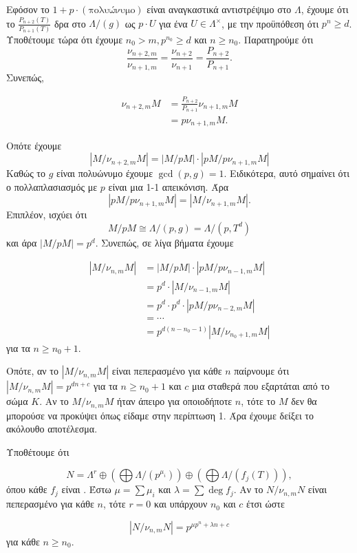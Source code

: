 \noindent Εφόσον το $1+p\cdot (\text{πολυώνυμο})$ είναι αναγκαστικά αντιστρέψιμο στο $\Lambda$, έχουμε ότι το $\frac{P_{n+2}(T)}{P_{n+1}(T)}$ δρα στο $\Lambda/(g)$ ως $p\cdot U$ για ένα $U \in \Lambda^\times$, με την προϋπόθεση ότι $p^n\geq d$. 
Υποθέτουμε τώρα ότι έχουμε $n_0 > m, p^{n_0} \geq d$ και $n\geq n_0$. Παρατηρούμε ότι
$$\frac{\nu_{n+2,m}}{\nu_{n+1,m}} = \frac{\nu_{n+2}}{\nu_{n+1}} = \frac{P_{n+2}}{P_{n+1}}.$$ Συνεπώς,

\begin{align*}
    \nu_{n+2,m} M &= \frac{P_{n+2}}{P_{n+1}} \nu_{n+1,m} M \\
    &= p \nu_{n+1,m}M .
\end{align*}

\noindent Οπότε έχουμε
$$|M/\nu_{n+2,m}M| = |M/pM| \cdot |pM/p\nu_{n+1,m}M|$$ Καθώς το $g$ είναι  πολυώνυμο έχουμε $\gcd(p,g)=1$. Ειδικότερα, αυτό σημαίνει ότι ο πολλαπλασιασμός με $p$ είναι μια 1-1 απεικόνιση. Άρα
$$|pM/p\nu_{n+1,m}M| = |M/\nu_{n+1,m}M|.$$ Επιπλέον, ισχύει ότι
$$M/pM \cong \Lambda/(p,g) = \Lambda/(p,T^d)$$ και άρα $|M/pM| = p^d$. Συνεπώς, σε λίγα βήματα έχουμε

\begin{align*}
    |M/\nu_{n,m}M| &= |M/pM| \cdot | pM/ p \nu_{n-1,m}M| \\
    &= p^d \cdot |M/\nu_{n-1,m}M| \\
    &= p^d \cdot p^d \cdot |pM/p\nu_{n-2,m}M| \\
    &= \cdots \\
    &= p^{d(n-n_0-1)}|M/\nu_{n_0+1,m}M|
\end{align*} για τα $n\geq n_0+1$.

\noindent Οπότε, αν το $|M/\nu_{n,m}M|$ είναι πεπερασμένο για κάθε $n$ παίρνουμε ότι $|M/\nu_{n,m}M| = p^{dn+c}$ για τα $n\geq n_0 + 1$ και $c$ μια σταθερά που εξαρτάται από το σώμα $K$. Αν το $M/\nu_{n,m}M$ ήταν άπειρο για οποιοδήποτε $n$, τότε το $M$ δεν θα μπορούσε να προκύψει όπως είδαμε στην περίπτωση 1. Άρα έχουμε δείξει το ακόλουθο αποτέλεσμα. 

\begin{prop}
    Υποθέτουμε ότι 

    $$N = \Lambda^r \oplus \left( \bigoplus \Lambda/(p^{\mu_i})\right) \oplus \left(\bigoplus \Lambda/(f_j(T))\right),$$ όπου κάθε $f_j$ είναι . Έστω $\mu = \sum \mu_i$ και $\lambda = \sum \deg f_j$. Αν το $N/\nu_{n,m}N$ είναι πεπερασμένο για κάθε $n$, τότε $r=0$ και υπάρχουν $n_0$ και $c$ έτσι ώστε

    $$|N/\nu_{n,m}N| = p^{\mu p^n + \lambda n + c}$$ για κάθε $n\geq n_0$.
\end{prop}

